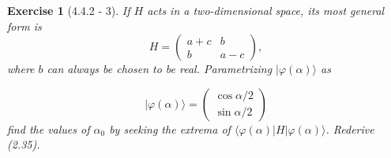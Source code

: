 \documentclass[12pt]{article}
\newtheorem{exercise}{Exercise}
\begin{document}
	\begin{exercise}[4.4.2 - 3]
		If $H$ acts in a two-dimensional space, its most general form is
		$$
		H=\left(\begin{array}{cc}
			a+c & b \\
			b & a-c
		\end{array}\right),
		$$
		where $b$ can always be chosen to be real. Parametrizing $|\varphi(\alpha)\rangle$ as
		
		$$
		|\varphi(\alpha)\rangle=\left(\begin{array}{c}
			\cos \alpha / 2 \\
			\sin \alpha / 2
		\end{array}\right)
		$$
		find the values of $\alpha_{0}$ by seeking the extrema of $\langle\varphi(\alpha)|H| \varphi(\alpha)\rangle$. Rederive (2.35).
	\end{exercise}
\end{document}
